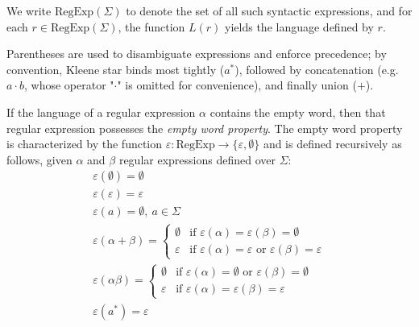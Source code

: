 We write $\text{RegExp}(\Sigma)$ to denote the set of all such syntactic expressions, and for each $r \in \text{RegExp}(\Sigma)$, the function $L(r)$ yields the language defined by $r$.

\medskip

Parentheses are used to disambiguate expressions and enforce precedence; by convention, Kleene star binds most tightly ($a^*$), followed by concatenation (e.g. $a \cdot b$, whose operator "$\cdot$" is omitted for convenience), and finally union ($+$).

If the language of a regular expression $\alpha$ contains the empty word, then that regular expression possesses the \textit{empty word property}.
The empty word property is characterized by the function $\varepsilon : \text{RegExp} \rightarrow \{ \varepsilon, \emptyset \}$ and is defined recursively as follows, given $\alpha$ and $\beta$ regular expressions defined over $\Sigma$:
\begin{gather*}
	\varepsilon(\emptyset) = \emptyset \\
	\varepsilon(\varepsilon) = \varepsilon \\
	\varepsilon(a) = \emptyset, \: a \in \Sigma \\
	\varepsilon(\alpha + \beta) = \begin{cases}
		\emptyset & \text{if $\varepsilon(\alpha) = \varepsilon(\beta) = \emptyset$} \\
		\varepsilon & \text{if $\varepsilon(\alpha) = \varepsilon$ or $\varepsilon(\beta) = \varepsilon$}
	\end{cases} \\
	\varepsilon(\alpha \beta) = \begin{cases}
		\emptyset & \text{if $\varepsilon(\alpha) = \emptyset$ or $\varepsilon(\beta) = \emptyset$} \\
		\varepsilon & \text{if $\varepsilon(\alpha) = \varepsilon(\beta) = \varepsilon$}
	\end{cases} \\
	\varepsilon(a^*) = \varepsilon
\end{gather*}



